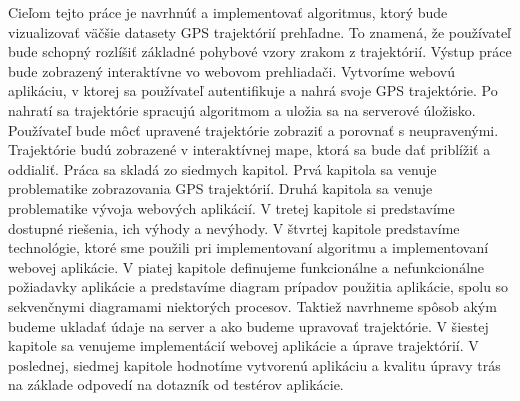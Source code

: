 Cieľom tejto práce je navrhnúť a implementovať algoritmus, ktorý bude vizualizovať väčšie datasety GPS trajektórií prehľadne. To znamená, že používateľ bude schopný rozlíšiť základné pohybové vzory zrakom z trajektórií. Výstup práce bude zobrazený interaktívne vo webovom prehliadači. Vytvoríme webovú aplikáciu, v ktorej sa používateľ autentifikuje a nahrá svoje GPS trajektórie.  Po nahratí sa trajektórie spracujú algoritmom a uložia sa na serverové úložisko. Používateľ bude môcť upravené trajektórie zobraziť a porovnať s neupravenými. Trajektórie budú zobrazené v interaktívnej mape, ktorá sa bude dať priblížiť a oddialiť. Práca sa skladá zo siedmych kapitol. Prvá kapitola sa venuje problematike zobrazovania GPS trajektórií. Druhá kapitola sa venuje problematike vývoja webových aplikácií. V tretej kapitole si predstavíme dostupné riešenia, ich výhody a nevýhody. V štvrtej kapitole predstavíme technológie, ktoré sme použili pri implementovaní algoritmu a implementovaní webovej aplikácie. V piatej kapitole definujeme funkcionálne a nefunkcionálne požiadavky aplikácie a predstavíme diagram prípadov použitia aplikácie, spolu so sekvenčnymi diagramami niektorých procesov. Taktiež navrhneme spôsob akým budeme ukladať údaje na server a ako budeme upravovať trajektórie. V šiestej kapitole sa venujeme implementácií webovej aplikácie a úprave trajektórií. V poslednej, siedmej kapitole hodnotíme vytvorenú aplikáciu a kvalitu úpravy trás na základe odpovedí na dotazník od testérov aplikácie.